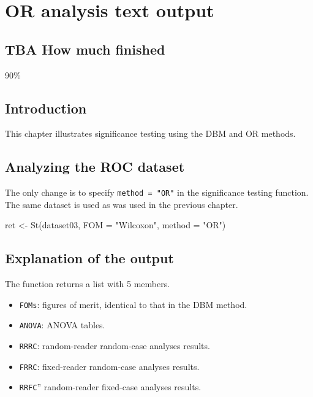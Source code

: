 \documentclass[
]{book}
\newenvironment{Shaded}{\begin{snugshade}}{\end{snugshade}}
\newcommand{\AttributeTok}[1]{\textcolor[rgb]{0.77,0.63,0.00}{#1}}
\newcommand{\FunctionTok}[1]{\textcolor[rgb]{0.00,0.00,0.00}{#1}}
\newcommand{\NormalTok}[1]{#1}
\newcommand{\OtherTok}[1]{\textcolor[rgb]{0.56,0.35,0.01}{#1}}
\newcommand{\StringTok}[1]{\textcolor[rgb]{0.31,0.60,0.02}{#1}}
\providecommand{\tightlist}{%
  \setlength{\itemsep}{0pt}\setlength{\parskip}{0pt}}
\begin{document}
\hypertarget{quick-start-or-text}{%
\chapter{OR analysis text output}\label{quick-start-or-text}}

\hypertarget{quick-start-or-text-how-much-finished}{%
\section{TBA How much finished}\label{quick-start-or-text-how-much-finished}}

90\%

\hypertarget{quick-start-or-text-intro}{%
\section{Introduction}\label{quick-start-or-text-intro}}

This chapter illustrates significance testing using the DBM and OR methods.

\hypertarget{quick-start-or-text-analyze-dataset}{%
\section{Analyzing the ROC dataset}\label{quick-start-or-text-analyze-dataset}}

The only change is to specify \texttt{method\ =\ "OR"} in the significance testing function. The same dataset is used as was used in the previous chapter.

\begin{Shaded}
\begin{Highlighting}[]
\NormalTok{ret }\OtherTok{\textless{}{-}} \FunctionTok{St}\NormalTok{(dataset03, }\AttributeTok{FOM =} \StringTok{"Wilcoxon"}\NormalTok{, }\AttributeTok{method =} \StringTok{"OR"}\NormalTok{)}
\end{Highlighting}
\end{Shaded}

\hypertarget{quick-start-or-text-explanation}{%
\section{Explanation of the output}\label{quick-start-or-text-explanation}}

The function returns a list with 5 members.

\begin{itemize}
\tightlist
\item
  \texttt{FOMs}: figures of merit, identical to that in the DBM method.
\item
  \texttt{ANOVA}: ANOVA tables.
\item
  \texttt{RRRC}: random-reader random-case analyses results.
\item
  \texttt{FRRC}: fixed-reader random-case analyses results.
\item
  \texttt{RRFC}'' random-reader fixed-case analyses results.
\end{itemize}
\end{document}
